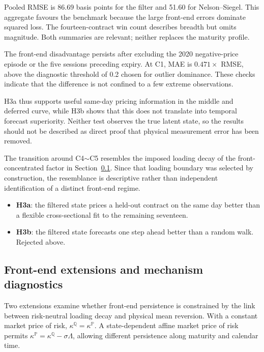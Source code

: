 \documentclass[journal]{IEEEtran}
\newcommand{\rng}{\ensuremath{\sim}}
\begin{document}
Pooled RMSE is 86.69 basis points for the filter and 51.60 for Nelson--Siegel. This aggregate favours the benchmark because the large front-end errors dominate squared loss. The fourteen-contract win count describes breadth but omits magnitude. Both summaries are relevant; neither replaces the maturity profile.

The front-end disadvantage persists after excluding the 2020 negative-price episode or the five sessions preceding expiry. At C1, MAE is $0.471\times$ RMSE, above the diagnostic threshold of 0.2 chosen for outlier dominance. These checks indicate that the difference is not confined to a few extreme observations.

H3a thus supports useful same-day pricing information in the middle and deferred curve, while H3b shows that this does not translate into temporal forecast superiority. Neither test observes the true latent state, so the results should not be described as direct proof that physical measurement error has been removed.

The transition around C4\rng{}C5 resembles the imposed loading decay of the front-concentrated factor in Section~\ref{sec:rungs}. Since that loading boundary was selected by construction, the resemblance is descriptive rather than independent identification of a distinct front-end regime.

\begin{itemize}
\item \textbf{H3a}: the filtered state prices a held-out contract on the same day better than a flexible cross-sectional fit to the remaining seventeen.
\item \textbf{H3b}: the filtered state forecasts one step ahead better than a random walk. Rejected above.
\end{itemize}

\subsection{Front-end extensions and mechanism diagnostics}
\label{sec:rungs}

Two extensions examine whether front-end persistence is constrained by the link between risk-neutral loading decay and physical mean reversion. With a constant market price of risk, $\kappa^{\mathbb{Q}}=\kappa^{\mathbb{P}}$. A state-dependent affine market price of risk permits $\kappa^{\mathbb{P}}=\kappa^{\mathbb{Q}}-\sigma\Lambda$, allowing different persistence along maturity and calendar time.
\end{document}
